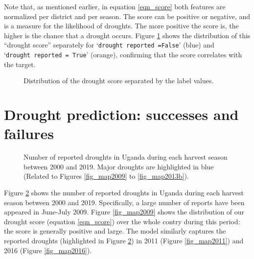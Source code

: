 \documentclass[10pt,parskip=half,
toc=sectionentrywithdots,
bibliography=totocnumbered,
captions=tableheading,numbers=noendperiod]{scrartcl}
\begin{document}
Note that, as mentioned earlier, in equation \ref{eqn_score} both
features are normalized per district and per season. The score can be
positive or negative, and is a measure for the likelihood of droughts.
The more positive the score is, the higher is the chance that a drought
occurs. Figure \ref{fig_score} shows the distribution of this ``drought
score'' separately for `\texttt{drought\ reported\ =False}' (blue) and
`\texttt{drought\ reported\ =\ True}' (orange), confirming that the
score correlates with the target.

\begin{figure}[H]\begin{center}\end{center}\caption{Distribution of the drought score separated by the label values.}\label{fig_score}\end{figure}

\hypertarget{drought-prediction-successes-and-failures}{%
\section{Drought prediction: successes and
failures}\label{drought-prediction-successes-and-failures}}

\begin{figure}[H]\begin{center}\end{center}\caption{Number of reported droughts in Uganda during each harvest season between
2000 and 2019. Major droughts are highlighted in blue (Related to
Figures \ref{fig_map2009} to \ref{fig_map2013b}).}\label{fig_droughtcount_seasonal}\end{figure}

Figure \ref{fig_droughtcount_seasonal} shows the number of reported
droughts in Uganda during each harvest season between 2000 and 2019.
Specifically, a large number of reports have been appeared in June-July
2009. Figure \ref{fig_map2009} shows the distribution of our drought
score (equation \ref{eqn_score}) over the whole contry during this
period: the score is generally positive and large. The model similarly
captures the reported droughts (highlighted in Figure
\ref{fig_droughtcount_seasonal}) in 2011 (Figure \ref{fig_map2011}) and
2016 (Figure \ref{fig_map2016}).
\end{document}
